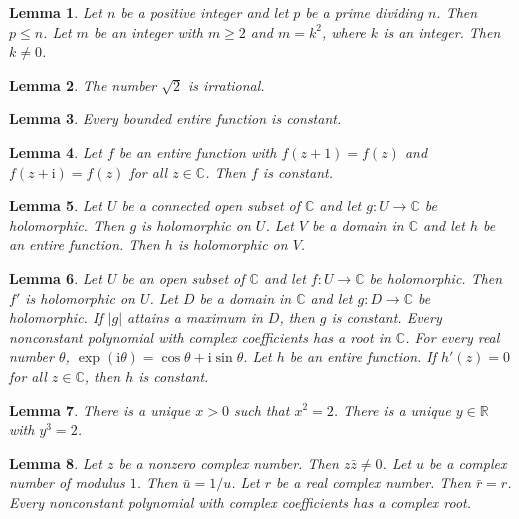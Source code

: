 \documentclass{article}
\newtheorem{lemma}{Lemma}
\begin{document}
\begin{lemma}\label{prime-dividing}
Let $n$ be a positive integer and let $p$ be a prime dividing $n$. Then $p\le n$. Let $m$ be an integer with $m\ge2$ and $m=k^2$, where $k$ is an integer. Then $k\neq0$.
\end{lemma}

\begin{lemma}\label{appositive}
The number $\sqrt2$ is irrational.
\end{lemma}

\begin{lemma}\label{liouville}
Every bounded entire function is constant.
\end{lemma}

\begin{lemma}\label{doubly-periodic}
Let $f$ be an entire function with $f(z+1)=f(z)$ and $f(z+\mathrm{i})=f(z)$ for all $z\in\mathbb{C}$. Then $f$ is constant.
\end{lemma}

\begin{lemma}\label{holomorphic-on}
Let $U$ be a connected open subset of $\mathbb{C}$ and let $g\colon U\to\mathbb{C}$ be holomorphic. Then $g$ is holomorphic on $U$. Let $V$ be a domain in $\mathbb{C}$ and let $h$ be an entire function. Then $h$ is holomorphic on $V$.
\end{lemma}

\begin{lemma}\label{complex-analysis}
Let $U$ be an open subset of $\mathbb{C}$ and let $f\colon U\to\mathbb{C}$ be holomorphic. Then $f'$ is holomorphic on $U$. Let $D$ be a domain in $\mathbb{C}$ and let $g\colon D\to\mathbb{C}$ be holomorphic. If $|g|$ attains a maximum in $D$, then $g$ is constant. Every nonconstant polynomial with complex coefficients has a root in $\mathbb{C}$. For every real number $\theta$, $\exp(\mathrm{i}\theta)=\cos\theta+\mathrm{i}\sin\theta$. Let $h$ be an entire function. If $h'(z)=0$ for all $z\in\mathbb{C}$, then $h$ is constant.
\end{lemma}

\begin{lemma}\label{unique-root}
There is a unique $x>0$ such that $x^2=2$. There is a unique $y\in\mathbb{R}$ with $y^3=2$.
\end{lemma}

\begin{lemma}\label{complex-modifiers}
Let $z$ be a nonzero complex number. Then $z\bar z\ne0$. Let $u$ be a complex number of modulus $1$. Then $\bar u=1/u$. Let $r$ be a real complex number. Then $\bar r=r$. Every nonconstant polynomial with complex coefficients has a complex root.
\end{lemma}
\end{document}
